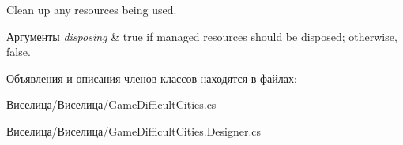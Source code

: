 Clean up any resources being used. 


\begin{DoxyParams}{Аргументы}
{\em disposing} & true if managed resources should be disposed; otherwise, false.\\
\hline
\end{DoxyParams}


Объявления и описания членов классов находятся в файлах\+:\begin{DoxyCompactItemize}
\item 
Виселица/Виселица/\hyperlink{_game_difficult_cities_8cs}{Game\+Difficult\+Cities.\+cs}\item 
Виселица/Виселица/Game\+Difficult\+Cities.\+Designer.\+cs\end{DoxyCompactItemize}

